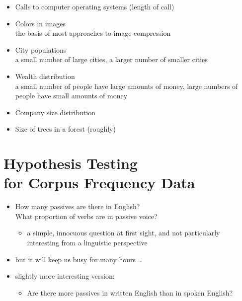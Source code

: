 \documentclass[a4paper,landscape,headrule,footrule,xetex]{foils}
\begin{document}

\begin{itemize}
\item Calls to computer operating systems (length of call)
\item Colors in images
    \\ the basis of most approaches to image compression
  \item City populations 
\\ a small number of large cities, a larger number of smaller cities
\item Wealth distribution 
\\ a small number of people have large amounts of money, large numbers of people have small amounts of money
\item  Company size distribution
\item Size of trees in a forest (roughly)
\end{itemize}
  

\section{Hypothesis Testing \\ for Corpus Frequency Data}

\begin{itemize}
\item How many passives are there in English?
  \\ What proportion of verbs are in passive voice?
\begin{itemize}
\item a simple, innocuous question at first sight, and not
particularly interesting from a linguistic perspective
\end{itemize}
\item but it will keep us busy for many hours …
\item slightly more interesting version:
  \begin{itemize}
  \item Are there more passives in written English
than in spoken English?
\end{itemize}
\end{itemize}
\end{document}
